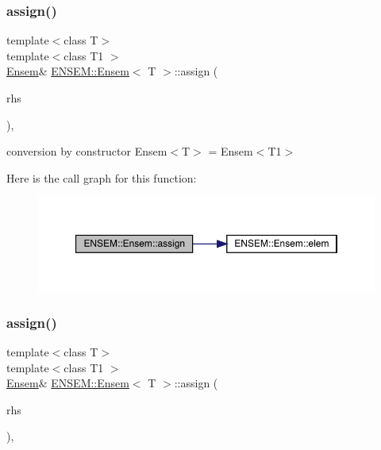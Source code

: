 \subsubsection{\texorpdfstring{assign()}{assign()}\hspace{0.1cm}{\footnotesize\ttfamily [4/12]}}
{\footnotesize\ttfamily template$<$class T$>$ \\
template$<$class T1 $>$ \\
\mbox{\hyperlink{classENSEM_1_1Ensem}{Ensem}}\& \mbox{\hyperlink{classENSEM_1_1Ensem}{E\+N\+S\+E\+M\+::\+Ensem}}$<$ T $>$\+::assign (\begin{DoxyParamCaption}\item[{const \mbox{\hyperlink{classENSEM_1_1Ensem}{Ensem}}$<$ T1 $>$ \&}]{rhs }\end{DoxyParamCaption})\hspace{0.3cm}{\ttfamily [inline]}, {\ttfamily [protected]}}



conversion by constructor Ensem$<$\+T$>$ = Ensem$<$\+T1$>$ 

Here is the call graph for this function\+:
\nopagebreak
\begin{figure}[H]
\begin{center}
\leavevmode
\includegraphics[width=350pt]{d7/d3e/classENSEM_1_1Ensem_a43d968c090e5f6c518881cf7ff44d200_cgraph}
\end{center}
\end{figure}
\mbox{\label{classENSEM_1_1Ensem_a43d968c090e5f6c518881cf7ff44d200}} 
\subsubsection{\texorpdfstring{assign()}{assign()}\hspace{0.1cm}{\footnotesize\ttfamily [5/12]}}
{\footnotesize\ttfamily template$<$class T$>$ \\
template$<$class T1 $>$ \\
\mbox{\hyperlink{classENSEM_1_1Ensem}{Ensem}}\& \mbox{\hyperlink{classENSEM_1_1Ensem}{E\+N\+S\+E\+M\+::\+Ensem}}$<$ T $>$\+::assign (\begin{DoxyParamCaption}\item[{const \mbox{\hyperlink{classENSEM_1_1Ensem}{Ensem}}$<$ T1 $>$ \&}]{rhs }\end{DoxyParamCaption})\hspace{0.3cm}{\ttfamily [inline]}, {\ttfamily [protected]}}



